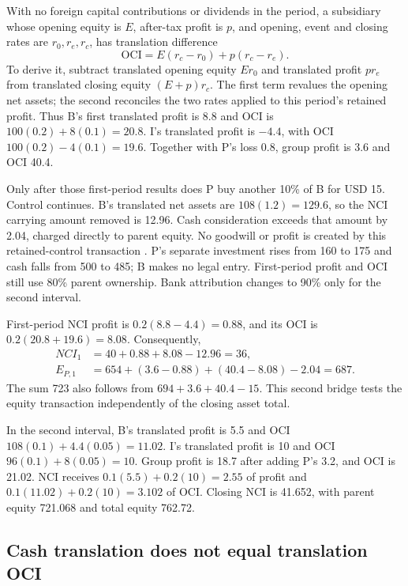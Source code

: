 With no foreign capital contributions or dividends in the period, a subsidiary
whose opening equity is \(E\), after-tax profit is \(p\), and opening,
event and closing rates are \(r_0,r_e,r_c\), has translation difference
\begin{equation}
 \mathrm{OCI}=E(r_c-r_0)+p(r_c-r_e).
 \label{eq:sector-translation-origin}
\end{equation}
To derive it, subtract translated opening equity \(Er_0\) and translated
profit \(pr_e\) from translated closing equity \((E+p)r_c\).
The first term revalues the opening net assets; the second reconciles the
two rates applied to this period's retained profit. Thus B's first translated
profit is 8.8 and OCI is \(100(0.2)+8(0.1)=20.8\). I's translated profit is
\(-4.4\), with OCI \(100(0.2)-4(0.1)=19.6\). Together with P's loss 0.8,
group profit is 3.6 and OCI 40.4.

Only after those first-period results does P buy another 10\% of B for USD 15.
Control continues. B's translated net assets are \(108(1.2)=129.6\), so the
NCI carrying amount removed is 12.96. Cash consideration exceeds that amount
by 2.04, charged directly to parent equity. No goodwill or profit is created
by this retained-control transaction \citep[IFRS~10.23,B 96]{eu20231803}.
P's separate investment rises from 160 to 175 and cash falls from 500 to 485;
B makes no legal entry. First-period profit and OCI still use 80\% parent
ownership. Bank attribution changes to 90\% only for the second interval.

First-period NCI profit is \(0.2(8.8-4.4)=0.88\), and its OCI is
\(0.2(20.8+19.6)=8.08\). Consequently,
\begin{align}
 NCI_1&=40+0.88+8.08-12.96=36,\\
 E_{P,1}&=654+(3.6-0.88)+(40.4-8.08)-2.04=687.
\end{align}
The sum 723 also follows from \(694+3.6+40.4-15\). This second bridge tests
the equity transaction independently of the closing asset total.

In the second interval, B's translated profit is 5.5 and OCI
\(108(0.1)+4.4(0.05)=11.02\). I's translated profit is 10 and OCI
\(96(0.1)+8(0.05)=10\). Group profit is 18.7 after adding P's 3.2, and
OCI is 21.02. NCI receives \(0.1(5.5)+0.2(10)=2.55\) of profit and
\(0.1(11.02)+0.2(10)=3.102\) of OCI. Closing NCI is 41.652, with parent
equity 721.068 and total equity 762.72.

\subsection{Cash translation does not equal translation OCI}

